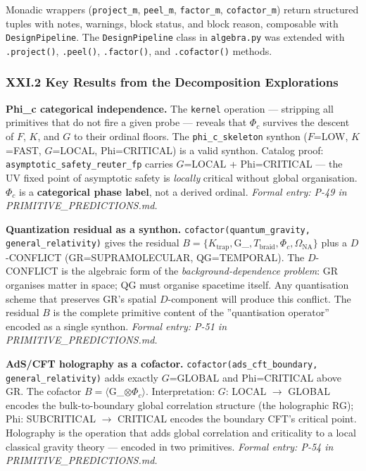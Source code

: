 \documentclass[12pt,a4paper]{article}
\begin{document}
Monadic wrappers (\texttt{project\_m}, \texttt{peel\_m}, \texttt{factor\_m}, \texttt{cofactor\_m}) return structured tuples with notes, warnings, block status, and block reason, composable with \texttt{DesignPipeline}. The \texttt{DesignPipeline} class in \texttt{algebra.py} was extended with \texttt{.project()}, \texttt{.peel()}, \texttt{.factor()}, and \texttt{.cofactor()} methods.

\subsubsection{XXI.2 Key Results from the Decomposition Explorations}

\textbf{Phi\_c categorical independence.} The \texttt{kernel} operation --- stripping all primitives that do not fire a given probe --- reveals that $\Phi_c$ survives the descent of $F$, $K$, and $G$ to their ordinal floors. The \texttt{phi\_c\_skeleton} synthon ($F$=LOW, $K$=FAST, $G$=LOCAL, Phi=CRITICAL) is a valid synthon. Catalog proof: \texttt{asymptotic\_safety\_reuter\_fp} carries $G$=LOCAL + Phi=CRITICAL --- the UV fixed point of asymptotic safety is \emph{locally} critical without global organisation. $\Phi_c$ is a \textbf{categorical phase label}, not a derived ordinal. \emph{Formal entry: P-49 in PRIMITIVE\_PREDICTIONS.md.}

\textbf{Quantization residual as a synthon.} \texttt{cofactor(quantum\_gravity, general\_relativity)} gives the residual $B = \{K_\text{trap}, $G_{\aleph}$, T_\text{braid}, \Phi_c, \Omega_\text{NA}\}$ plus a $D$-CONFLICT (GR=SUPRAMOLECULAR, QG=TEMPORAL). The $D$-CONFLICT is the algebraic form of the \emph{background-dependence problem}: GR organises matter in space; QG must organise spacetime itself. Any quantisation scheme that preserves GR's spatial $D$-component will produce this conflict. The residual $B$ is the complete primitive content of the ''quantisation operator'' encoded as a single synthon. \emph{Formal entry: P-51 in PRIMITIVE\_PREDICTIONS.md.}

\textbf{AdS/CFT holography as a cofactor.} \texttt{cofactor(ads\_cft\_boundary, general\_relativity)} adds exactly $G$=GLOBAL and Phi=CRITICAL above GR. The cofactor $B = \langle $G_{\aleph}$ \otimes \Phi_c \rangle$. Interpretation: $G$: LOCAL $\rightarrow$ GLOBAL encodes the bulk-to-boundary global correlation structure (the holographic RG); Phi: SUBCRITICAL $\rightarrow$ CRITICAL encodes the boundary CFT's critical point. Holography is the operation that adds global correlation and criticality to a local classical gravity theory --- encoded in two primitives. \emph{Formal entry: P-54 in PRIMITIVE\_PREDICTIONS.md.}
\end{document}
